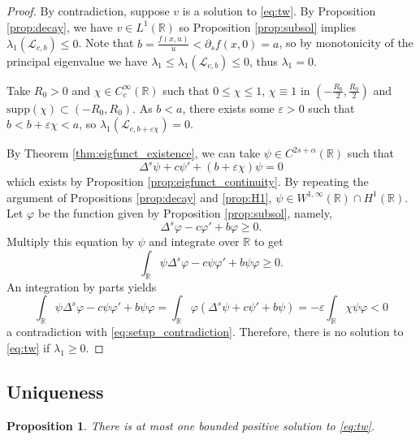 \documentclass[11pt,a4paper]{amsart}
\newcommand{\Lop}{\mathcal{L}}
\newcommand{\R}{\mathbb{R}}
\renewcommand{\phi}{\varphi}
\renewcommand{\epsilon}{\varepsilon}
\newtheorem{prop}[thm]{Proposition}
\begin{document}
\begin{proof}
By contradiction, suppose $v$ is a solution to \eqref{eq:tw}. By Proposition \ref{prop:decay}, we have $v\in L^1(\R)$ so Proposition \ref{prop:subsol} implies $\lambda_1(\Lop_{c,b})\leq 0$. Note that $b = \frac{f(x,u)}{u} < \partial_s f(x,0) = a$, so by monotonicity of the principal eigenvalue we have $\lambda_1 \leq \lambda_1(\Lop_{c,b})\leq 0$, thus $\lambda_1 = 0$.

Take $R_0 >0$ and $\chi \in C_c^{\infty}(\R)$ such that $0\leq \chi \leq 1$, $\chi \equiv 1$ in $(-\frac{R_0}{2},\frac{R_0}{2})$ and $\mathrm{supp}(\chi) \subset (-R_0, R_0)$. As $b < a$, there exists some $\epsilon >0$ such that $b< b+ \epsilon \chi <a$, so $\lambda_1(\Lop_{c,b+\epsilon\chi})=0$. 

By Theorem \ref{thm:eigfunct_existence}, we can take $\psi \in C^{2s + \alpha}(\R)$ such that 
\[ \Delta^s \psi + c\psi' + (b + \epsilon\chi) \psi = 0\]
which exists by Proposition \ref{prop:eigfunct_continuity}. By repeating the argument of Propositions \ref{prop:decay} and \ref{prop:H1}, $\psi \in W^{1,\infty}(\R) \cap H^1(\R)$. Let $\phi$ be the function given by Proposition \ref{prop:subsol}, namely, 
\[\Delta^s \phi - c\phi' +b \phi \geq 0.\]
Multiply this equation by $\psi$ and integrate over $\R$ to get
\begin{equation}
\label{eq:setup_contradiction}
\int_{\R} \psi \Delta^s \phi - c \psi \phi' + b\psi\phi \geq 0.
\end{equation}
An integration by parts yields
\[\int_{\R} \psi \Delta^s \phi - c \psi \phi' + b\psi\phi = \int_{\R} \phi(\Delta^s \psi + c\psi' + b \psi) = -\epsilon \int_{\R} \chi \psi \phi 
< 0\]
a contradiction with \eqref{eq:setup_contradiction}. Therefore, there is no solution to \eqref{eq:tw} if $\lambda_1 \geq 0$.
\end{proof}

\subsection{Uniqueness}

\begin{prop}
There is at most one bounded positive solution to \eqref{eq:tw}.
\end{prop}
\end{document}
